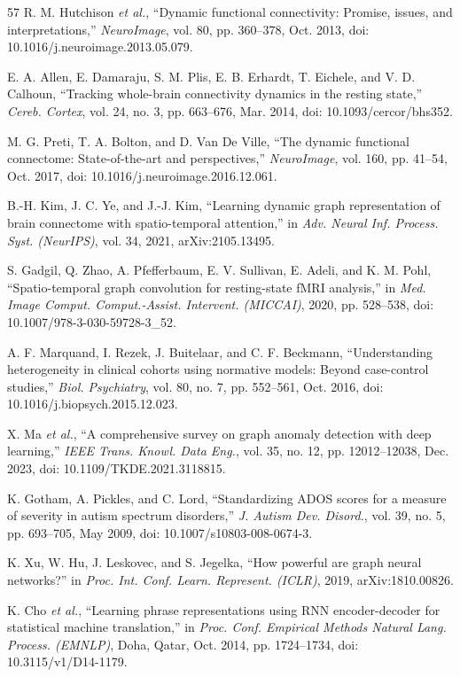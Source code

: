 \begin{thebibliography}{57}
R. M. Hutchison \emph{et al.}, ``Dynamic functional connectivity: Promise, issues, and interpretations,'' \emph{NeuroImage}, vol. 80, pp. 360--378, Oct. 2013, doi: 10.1016/j.neuroimage.2013.05.079.

E. A. Allen, E. Damaraju, S. M. Plis, E. B. Erhardt, T. Eichele, and V. D. Calhoun, ``Tracking whole-brain connectivity dynamics in the resting state,'' \emph{Cereb. Cortex}, vol. 24, no. 3, pp. 663--676, Mar. 2014, doi: 10.1093/cercor/bhs352.

M. G. Preti, T. A. Bolton, and D. Van De Ville, ``The dynamic functional connectome: State-of-the-art and perspectives,'' \emph{NeuroImage}, vol. 160, pp. 41--54, Oct. 2017, doi: 10.1016/j.neuroimage.2016.12.061.

B.-H. Kim, J. C. Ye, and J.-J. Kim, ``Learning dynamic graph representation of brain connectome with spatio-temporal attention,'' in \emph{Adv. Neural Inf. Process. Syst. (NeurIPS)}, vol. 34, 2021, arXiv:2105.13495.

S. Gadgil, Q. Zhao, A. Pfefferbaum, E. V. Sullivan, E. Adeli, and K. M. Pohl, ``Spatio-temporal graph convolution for resting-state fMRI analysis,'' in \emph{Med. Image Comput. Comput.-Assist. Intervent. (MICCAI)}, 2020, pp. 528--538, doi: 10.1007/978-3-030-59728-3\_52.

A. F. Marquand, I. Rezek, J. Buitelaar, and C. F. Beckmann, ``Understanding heterogeneity in clinical cohorts using normative models: Beyond case-control studies,'' \emph{Biol. Psychiatry}, vol. 80, no. 7, pp. 552--561, Oct. 2016, doi: 10.1016/j.biopsych.2015.12.023.

X. Ma \emph{et al.}, ``A comprehensive survey on graph anomaly detection with deep learning,'' \emph{IEEE Trans. Knowl. Data Eng.}, vol. 35, no. 12, pp. 12012--12038, Dec. 2023, doi: 10.1109/TKDE.2021.3118815.

K. Gotham, A. Pickles, and C. Lord, ``Standardizing ADOS scores for a measure of severity in autism spectrum disorders,'' \emph{J. Autism Dev. Disord.}, vol. 39, no. 5, pp. 693--705, May 2009, doi: 10.1007/s10803-008-0674-3.

K. Xu, W. Hu, J. Leskovec, and S. Jegelka, ``How powerful are graph neural networks?'' in \emph{Proc. Int. Conf. Learn. Represent. (ICLR)}, 2019, arXiv:1810.00826.

K. Cho \emph{et al.}, ``Learning phrase representations using RNN encoder-decoder for statistical machine translation,'' in \emph{Proc. Conf. Empirical Methods Natural Lang. Process. (EMNLP)}, Doha, Qatar, Oct. 2014, pp. 1724--1734, doi: 10.3115/v1/D14-1179.


\end{thebibliography}
